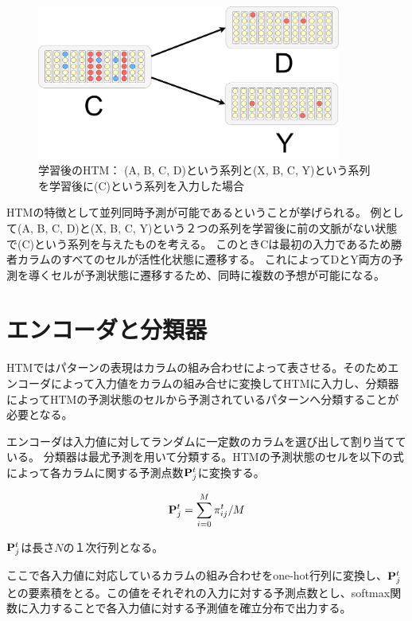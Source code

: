 \begin{figure}[ht]
  \begin{center}
    \includegraphics[width=10cm]{./fig/drawing_8}
    \caption{学習後のHTM： (A, B, C, D)という系列と(X, B, C, Y)という系列を学習後に(C)という系列を入力した場合}
    \label{fig:HTM_parallel_prediction}
  \end{center}
\end{figure}

HTMの特徴として並列同時予測が可能であるということが挙げられる。
例として(A, B, C, D)と(X, B, C, Y)という２つの系列を学習後に前の文脈がない状態で(C)という系列を与えたものを考える。
このときCは最初の入力であるため勝者カラムのすべてのセルが活性化状態に遷移する。
これによってDとY両方の予測を導くセルが予測状態に遷移するため、同時に複数の予想が可能になる。

\newpage
\section{エンコーダと分類器}
HTMではパターンの表現はカラムの組み合わせによって表させる。そのためエンコーダによって入力値をカラムの組み合せに変換してHTMに入力し、分類器によってHTMの予測状態のセルから予測されているパターンへ分類することが必要となる。

エンコーダは入力値に対してランダムに一定数のカラムを選び出して割り当てている。
分類器は最尤予測を用いて分類する。HTMの予測状態のセルを以下の式によって各カラムに関する予測点数${\bf P}^t_j$に変換する。

\begin{equation}
  {\bf P}^t_j = \sum^{M}_{i=0} \pi^t_{ij} / M
\end{equation}

${\bf P}^t_j$は長さ$N$の１次行列となる。

ここで各入力値に対応しているカラムの組み合わせをone-hot行列に変換し、${\bf P}^t_j$との要素積をとる。この値をそれぞれの入力に対する予測点数とし、softmax関数に入力することで各入力値に対する予測値を確立分布で出力する。

